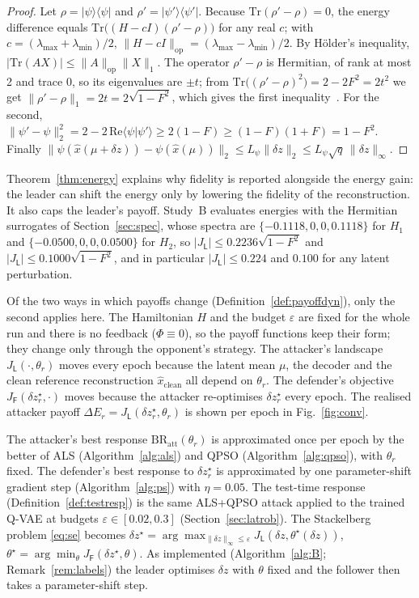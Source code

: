 \documentclass[conference]{IEEEtran}
\newcommand{\BR}{\mathrm{BR}}
\begin{document}
\begin{proof}
Let $\rho=|\psi\rangle\langle\psi|$ and $\rho'=|\psi'\rangle\langle\psi'|$. Because $\mathrm{Tr}(\rho'-\rho)=0$, the energy difference equals $\mathrm{Tr}\big((H-c I)(\rho'-\rho)\big)$ for any real $c$; with $c=(\lambda_{\max}+\lambda_{\min})/2$, $\|H-cI\|_{\mathrm{op}}=(\lambda_{\max}-\lambda_{\min})/2$. By H\"older's inequality, $|\mathrm{Tr}(AX)|\le\|A\|_{\mathrm{op}}\|X\|_1$. The operator $\rho'-\rho$ is Hermitian, of rank at most 2 and trace 0, so its eigenvalues are $\pm t$; from $\mathrm{Tr}\big((\rho'-\rho)^2\big)=2-2F^2=2t^2$ we get $\|\rho'-\rho\|_1=2t=2\sqrt{1-F^2}$, which gives the first inequality~\cite{nielsen2010}. For the second, $\|\psi'-\psi\|_2^2=2-2\,\mathrm{Re}\langle\psi|\psi'\rangle\ge2(1-F)\ge(1-F)(1+F)=1-F^2$. Finally $\|\psi(\hat x(\mu+\delta z))-\psi(\hat x(\mu))\|_2\le L_\psi\|\delta z\|_2\le L_\psi\sqrt q\,\|\delta z\|_\infty$.
\end{proof}

Theorem~\ref{thm:energy} explains why fidelity is reported alongside the energy gain: the leader can shift the energy only by lowering the fidelity of the reconstruction. It also caps the leader's payoff. Study~B evaluates energies with the Hermitian surrogates of Section~\ref{sec:spec}, whose spectra are $\{-0.1118,0,0,0.1118\}$ for $H_1$ and $\{-0.0500,0,0,0.0500\}$ for $H_2$, so $|J_{\mathsf L}|\le0.2236\sqrt{1-F^2}$ and $|J_{\mathsf L}|\le0.1000\sqrt{1-F^2}$, and in particular $|J_{\mathsf L}|\le0.224$ and $0.100$ for any latent perturbation.

Of the two ways in which payoffs change (Definition~\ref{def:payoffdyn}), only the second applies here. The Hamiltonian $H$ and the budget $\varepsilon$ are fixed for the whole run and there is no feedback ($\Phi\equiv0$), so the payoff functions keep their form; they change only through the opponent's strategy. The attacker's landscape $J_{\mathsf L}(\cdot,\theta_r)$ moves every epoch because the latent mean $\mu$, the decoder and the clean reference reconstruction $\hat x_{\mathrm{clean}}$ all depend on $\theta_r$. The defender's objective $J_{\mathsf F}(\delta z^\star_r,\cdot)$ moves because the attacker re-optimises $\delta z^\star_r$ every epoch. The realised attacker payoff $\Delta E_r=J_{\mathsf L}(\delta z^\star_r,\theta_r)$ is shown per epoch in Fig.~\ref{fig:conv}.

The attacker's best response $\BR_{\mathrm{att}}(\theta_r)$ is approximated once per epoch by the better of ALS (Algorithm~\ref{alg:als}) and QPSO (Algorithm~\ref{alg:qpso}), with $\theta_r$ fixed. The defender's best response to $\delta z^\star_r$ is approximated by one parameter-shift gradient step (Algorithm~\ref{alg:ps}) with $\eta=0.05$. The test-time response (Definition~\ref{def:testresp}) is the same ALS+QPSO attack applied to the trained Q-VAE at budgets $\varepsilon\in[0.02,0.3]$ (Section~\ref{sec:latrob}).
The Stackelberg problem \eqref{eq:se} becomes $\delta z^\star=\arg\max_{\|\delta z\|_\infty\le\varepsilon}J_{\mathsf L}(\delta z,\theta^\star(\delta z))$, $\theta^\star=\arg\min_\theta J_{\mathsf F}(\delta z^\star,\theta)$. As implemented (Algorithm~\ref{alg:B}; Remark~\ref{rem:labels}) the leader optimises $\delta z$ with $\theta$ fixed and the follower then takes a parameter-shift step.
\end{document}
